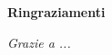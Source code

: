 \thispagestyle{empty}

\begin{center}
  {\bf \Huge Ringraziamenti}
\end{center}

\vspace{4cm}
\emph{Grazie a ...}